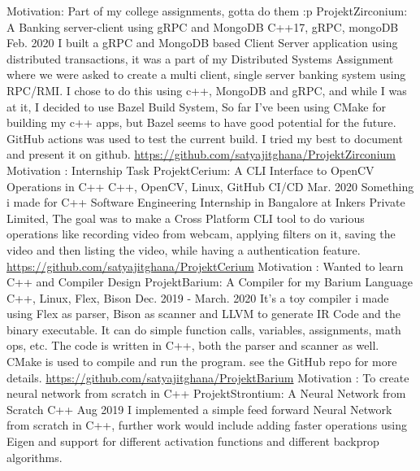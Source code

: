 \begin{cventries}
    \cventry
        {Motivation: Part of my college assignments, gotta do them :p}
        {ProjektZirconium: A Banking server-client using gRPC and MongoDB}
        {C++17, gRPC, mongoDB}
        {Feb. 2020}
        {
            I built a gRPC and MongoDB based Client Server application using distributed transactions, it was a part of my Distributed Systems Assignment where we were asked to create a multi client, single server banking system using RPC/RMI.
            I chose to do this using c++, MongoDB and gRPC, and while I was at it, I decided to use Bazel Build System, So far I've been using CMake for building my c++ apps, but Bazel seems to have good potential for the future.
            GitHub actions was used to test the current build. I tried my best to document and present it on github.
            \url{https://github.com/satyajitghana/ProjektZirconium}
        }
    \cventry
        {Motivation : Internship Task}
        {ProjektCerium: A CLI Interface to OpenCV Operations in C++}
        {C++, OpenCV, Linux, GitHub CI/CD}
        {Mar. 2020}
        {Something i made for C++ Software Engineering Internship in Bangalore at Inkers Private Limited,
        The goal was to make a Cross Platform CLI tool to do various operations like recording video from webcam, applying filters on it, saving the video and then listing the video, while having a authentication feature.
        \url{https://github.com/satyajitghana/ProjektCerium}
        }
    \cventry
        {Motivation : Wanted to learn C++ and Compiler Design}
        {ProjektBarium: A Compiler for my Barium Language}
        {C++, Linux, Flex, Bison}
        {Dec. 2019 - March. 2020}
        {
        It's a toy compiler i made using Flex as parser, Bison as scanner and LLVM to generate IR Code and the binary executable. It can do simple function calls, variables, assignments, math ops, etc. The code is written in C++, both the parser and scanner as well. CMake is used to compile and run the program. see the GitHub repo for more details.
        \url{https://github.com/satyajitghana/ProjektBarium}
        }
    \cventry
        {Motivation : To create neural network from scratch in C++}
        {ProjektStrontium: A Neural Network from Scratch}
        {C++}
        {Aug 2019}
        {
        I implemented a simple feed forward Neural Network from scratch in C++, further work would include adding faster operations using Eigen and support for different activation functions and different backprop algorithms.
}
\end{cventries}
